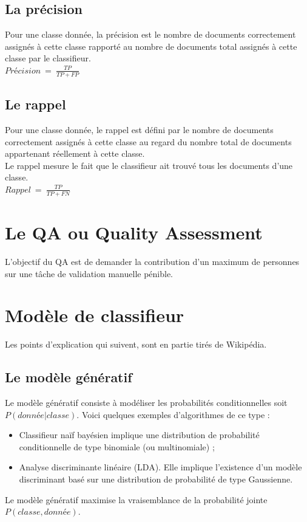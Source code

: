     \subsection{La précision}
    \label{annexe:precision}
        Pour une classe donnée, la précision est le nombre de documents correctement assignés à cette classe rapporté au nombre de documents total assignés à cette classe par le classifieur.\\
        $Précision\ =\ \frac{TP}{TP+FP}$


    \subsection{Le rappel}
    \label{annexe:rappel}
        Pour une classe donnée, le rappel est défini par le nombre de documents correctement assignés à cette classe au regard du nombre total de documents appartenant réellement à cette classe.\\
        Le rappel mesure le fait que le classifieur ait trouvé tous les documents d'une classe.\\
        $Rappel\ =\ \frac{TP}{TP+FN}$

\section{Le QA ou Quality Assessment}
\label{annexe:qa}
    L'objectif du QA est de demander la contribution d'un maximum de personnes sur une tâche de validation manuelle pénible.\\

\section{Modèle de classifieur}
    Les points d'explication qui suivent, sont en partie tirés de Wikipédia\autocite{wiki_discri_gene}.
    \subsection{Le modèle génératif}
    \label{annexe:generatif}
        Le modèle génératif consiste à modéliser les probabilités conditionnelles soit $P(donnée | classe)$. Voici quelques exemples d'algorithmes de ce type :
        \begin{itemize}
            \item Classifieur naïf bayésien implique une distribution de probabilité conditionnelle de type binomiale (ou multinomiale) ;
            \item Analyse discriminante linéaire (LDA). Elle implique l'existence d'un modèle discriminant basé sur une distribution de probabilité de type Gaussienne.
        \end{itemize}
        Le modèle génératif maximise la vraisemblance de la probabilité jointe $P(classe, donnée)$.

